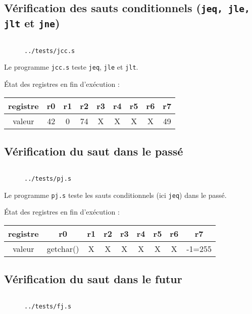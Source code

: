 \documentclass[twoside, 12pt, a4paper]{article}
\newcommand{\fm}[2]{
\begin{figure}[!h]
    \centering
    \inputminted[]{asm}{#1}
    \caption{\texttt{#2}}
\end{figure}
}
\begin{document}
\subsection{Vérification des sauts conditionnels (\texttt{jeq, jle, jlt} et \texttt{jne})}

\fm{../tests/jcc.s}{../tests/jcc.s}

Le programme \texttt{jcc.s} teste \texttt{jeq}, \texttt{jle} et \texttt{jlt}.

État des registres en fin d'exécution :
\begin{center}
    \ttfamily
        \begin{tabular}{|c|c|c|c|c|c|c|c|c|} 
         \hline
         registre & r0 & r1 & r2 & r3 & r4 & r5 & r6 & r7 \\
         \hline
         valeur   & 42  & 0  & 74  &  X & X  & X  &  X & 49\\
         \hline
    \end{tabular}
\end{center}

\subsection{Vérification du saut dans le passé}

\fm{../tests/pj.s}{../tests/pj.s}

Le programme \texttt{pj.s} teste les sauts conditionnels (ici \texttt{jeq}) dans le passé.

État des registres en fin d'exécution :
\begin{center}
    \ttfamily
        \begin{tabular}{|c|c|c|c|c|c|c|c|c|} 
         \hline
         registre & r0 & r1 & r2 & r3 & r4 & r5 & r6 & r7 \\
         \hline
         valeur   & getchar() & X  & X  &  X & X  & X  &  X & -1=255\\
         \hline
    \end{tabular}
\end{center}

\subsection{Vérification du saut dans le futur}

\begin{figure}
    \centering
    \inputminted{asm}{../tests/fj.s}
    \caption{\texttt{../tests/fj.s}}
    \label{fig:fj.s}
\end{figure}
\end{document}
